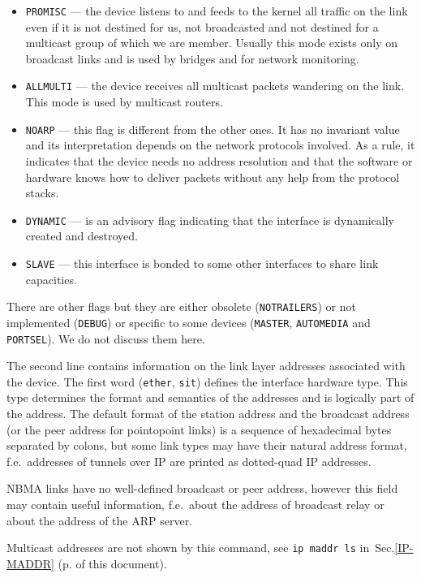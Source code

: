 \begin{itemize}
\item \verb|PROMISC| --- the device listens to and feeds to the kernel all
traffic on the link even if it is not destined for us, not broadcasted
and not destined for a multicast group of which we are member. Usually
this mode exists only on broadcast links and is used by bridges and for network
monitoring.

\item \verb|ALLMULTI| --- the device receives all multicast packets
wandering on the link. This mode is used by multicast routers.

\item \verb|NOARP| --- this flag is different from the other ones. It has
no invariant value and its interpretation depends on the network protocols
involved. As a rule, it indicates that the device needs no address
resolution and that the software or hardware knows how to deliver packets
without any help from the protocol stacks.

\item \verb|DYNAMIC| --- is an advisory flag indicating that the interface is
dynamically created and destroyed.

\item \verb|SLAVE| --- this interface is bonded to some other interfaces
to share link capacities.

\end{itemize}

\vskip 1mm
\begin{NB}
There are other flags but they are either obsolete (\verb|NOTRAILERS|)
or not implemented (\verb|DEBUG|) or specific to some devices
(\verb|MASTER|, \verb|AUTOMEDIA| and \verb|PORTSEL|). We do not discuss
them here.
\end{NB}


The second line contains information on the link layer addresses
associated with the device. The first word (\verb|ether|, \verb|sit|)
defines the interface hardware type. This type determines the format and semantics
of the addresses and is logically part of the address.
The default format of the station address and the broadcast address
(or the peer address for pointopoint links) is a
sequence of hexadecimal bytes separated by colons, but some link
types may have their natural address format, f.e.\ addresses
of tunnels over IP are printed as dotted-quad IP addresses.

\vskip 1mm
\begin{NB}
  NBMA links have no well-defined broadcast or peer address,
  however this field may contain useful information, f.e.\
  about the address of broadcast relay or about the address of the ARP server.
\end{NB}
\begin{NB}
Multicast addresses are not shown by this command, see
\verb|ip maddr ls| in~Sec.\ref{IP-MADDR} (p.\pageref{IP-MADDR} of this
document).
\end{NB}


